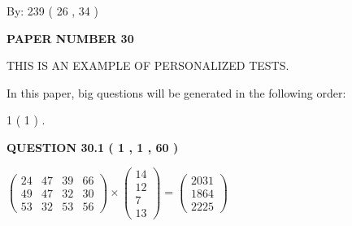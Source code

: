 \documentclass[12pt]{article}
\begin{document}
   
\hspace{1.0in} By: 
         239 (          26 ,           34 )
   
   
   
   
\newpage 
\setcounter{page}{ 
    30001 } 
   
   
   
   
 {\textbf{ \Large{ PAPER NUMBER           30  }}}
   
   
\vspace{0.2in}
   
   
   
   
   
   
 \vspace{0.2in}
{\Huge  THIS IS AN EXAMPLE OF}
{\Huge  PERSONALIZED TESTS. }
   
   
   
\vspace{0.2in}
   
In this paper, big questions will be generated in the following order: 
   
   
             1 (           1 )
 .
  
\vspace{0.2in}
  
{\textbf{\Large{QUESTION
30.1 
 (           1 ,           1 ,          60 )
}}}
  
  
 
 
\noindent{}

 
$\left( \begin{array}{ccccccccccccccc}
          24  & 
          47  & 
          39  & 
          66  \\ 
          49  & 
          47  & 
          32  & 
          30  \\ 
          53  & 
          32  & 
          53  & 
          56
\end{array}\right) \times
\left( \begin{array}{c}
          14  \\ 
          12  \\ 
           7  \\ 
          13
\end{array}\right)  =
\left( \begin{array}{c}
        2031  \\ 
        1864  \\ 
        2225
\end{array}\right)  $
 
\end{document}
